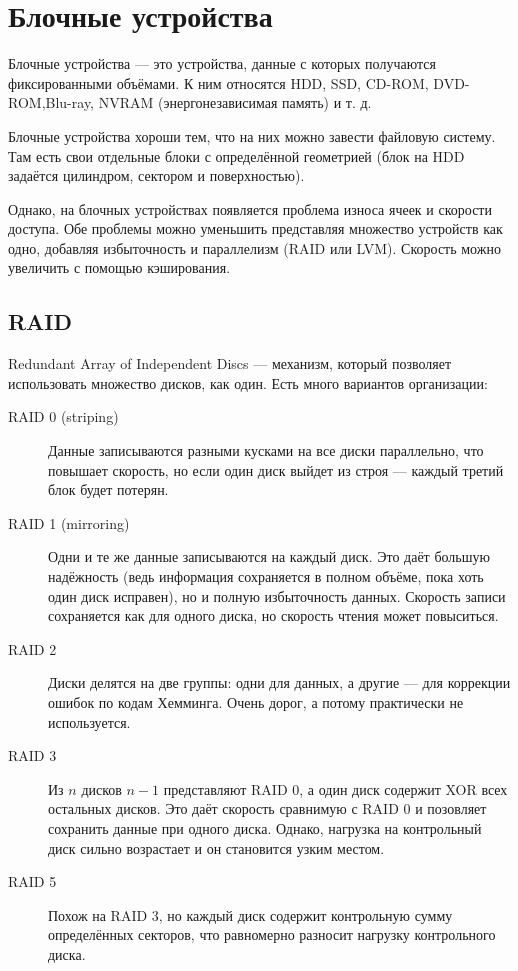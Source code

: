 \documentclass[main]{subfiles}
\begin{document}
\chapter{Блочные устройства}
Блочные устройства --- это устройства, данные с которых получаются
фиксированными объёмами. К ним относятся HDD, SSD, CD-ROM, DVD-ROM,Blu-ray,
NVRAM (энергонезависимая память) и т. д.

Блочные устройства хороши тем, что на них можно завести файловую систему.
Там есть свои отдельные блоки с определённой геометрией (блок на HDD задаётся
цилиндром, сектором и поверхностью).

Однако, на блочных устройствах появляется проблема износа ячеек и скорости
доступа. Обе проблемы можно уменьшить представляя множество устройств как
одно, добавляя избыточность и параллелизм (RAID или LVM). Скорость можно
увеличить с помощью кэширования.

\section{RAID}
Redundant Array of Independent Discs --- механизм, который позволяет
использовать множество дисков, как один. Есть много вариантов организации:

\begin{description}
\item[RAID 0 (striping)] Данные записываются разными кусками на все диски
параллельно, что повышает скорость, но если один диск выйдет из строя ---
каждый третий блок будет потерян.
\item[RAID 1 (mirroring)] Одни и те же данные записываются на каждый диск.
Это даёт большую надёжность (ведь информация сохраняется в полном объёме,
пока хоть один диск исправен), но и полную избыточность данных.
Скорость записи сохраняется как для одного диска, но скорость чтения
может повыситься.
\item[RAID 2] Диски делятся на две группы: одни для данных, а другие ---
для коррекции ошибок по кодам Хемминга. Очень дорог, а потому практически
не используется.
\item[RAID 3] Из $n$ дисков $n - 1$ представляют RAID 0, а один диск
содержит XOR всех остальных дисков. Это даёт скорость сравнимую с RAID 0
и позовляет сохранить данные при одного диска. Однако, нагрузка на
контрольный диск сильно возрастает и он становится узким местом.
\item[RAID 5] Похож на RAID 3, но каждый диск содержит контрольную сумму
определённых секторов, что равномерно разносит нагрузку контрольного диска.
\end{description}
\end{document}
